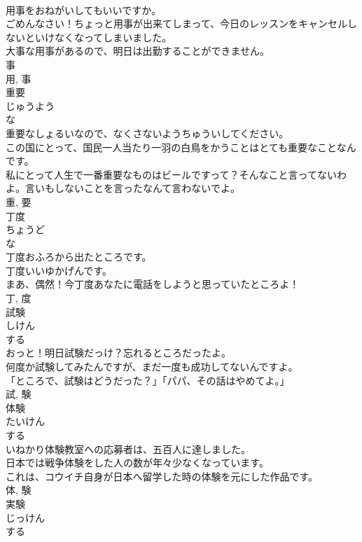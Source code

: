 \documentclass[8pt]{extreport}
\begin{document}
\begin{CJK}{UTF8}{min}
\\	用事をおねがいしてもいいですか。	
\\	ごめんなさい！ちょっと用事が出来てしまって、今日のレッスンをキャンセルしないといけなくなってしまいました。	
\\	大事な用事があるので、明日は出勤することができません。	
\\	事 
\\	用, 事	
\\	重要	
\\	じゅうよう	
\\	な 
\\	重要なしょるいなので、なくさないようちゅういしてください。	
\\	この国にとって、国民一人当たり一羽の白鳥をかうことはとても重要なことなんです。	
\\	私にとって人生で一番重要なものはビールですって？そんなこと言ってないわよ。言いもしないことを言ったなんて言わないでよ。	
\\	重, 要	
\\	丁度	
\\	ちょうど	
\\	な 
\\	丁度おふろから出たところです。	
\\	丁度いいゆかげんです。	
\\	まあ、偶然！今丁度あなたに電話をしようと思っていたところよ！	
\\	丁, 度	
\\	試験	
\\	しけん	
\\	する 
\\	おっと！明日試験だっけ？忘れるところだったよ。	
\\	何度か試験してみたんですが、まだ一度も成功してないんですよ。	
\\	「ところで、試験はどうだった？」「パパ、その話はやめてよ。」	
\\	試, 験	
\\	体験	
\\	たいけん	
\\	する 
\\	いねかり体験教室への応募者は、五百人に達しました。	
\\	日本では戦争体験をした人の数が年々少なくなっています。	
\\	これは、コウイチ自身が日本へ留学した時の体験を元にした作品です。	
\\	体, 験	
\\	実験	
\\	じっけん	
\\	する 

\end{CJK}
\end{document}
